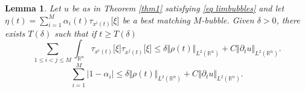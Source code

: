 \documentclass[11pt,letterpaper,reqno]{amsart}
\newcommand{\R}{\mathbb{R}}
\theoremstyle{plain}%
\newtheorem{lemma}[theorem]{Lemma}
\theoremstyle{definition}
\numberwithin{equation}{section}
\numberwithin{figure}{section}
\begin{document}
\begin{lemma}\label{lemma weakinter}
  Let $u$ be as in Theorem \ref{thm1} satisfying \eqref{eq limbubbles} and let $\eta(t) = \sum_{i=1}^M \alpha_i(t)\tau_{x^i(t)}\big[\xi\big]$ be a best matching $M$-bubble. Given $\delta>0$, there exists $T(\delta)$ such that if $t\geq T(\delta)$
\begin{equation}\label{eq simplfied interaction} 
\sum_{1\leq i < j \leq M}\int_{\R^n}\tau_{x^i(t)}\big[\xi\big]\tau_{x^j(t)}\big[\xi\big]\leq \delta \Vert \rho(t)\Vert_{L^2(\R^n)} + C\Vert \partial_tu\Vert_{L^2(\R^n)}.
\end{equation}
\begin{equation}\label{eq quantalpha}
    \sum_{i=1}^M|1-\alpha_i|\leq  \delta \Vert \rho(t)\Vert_{L^2(\R^n)} + C\Vert \partial_tu\Vert_{L^2(\R^n)}.
\end{equation}
\end{lemma}
\end{document}
